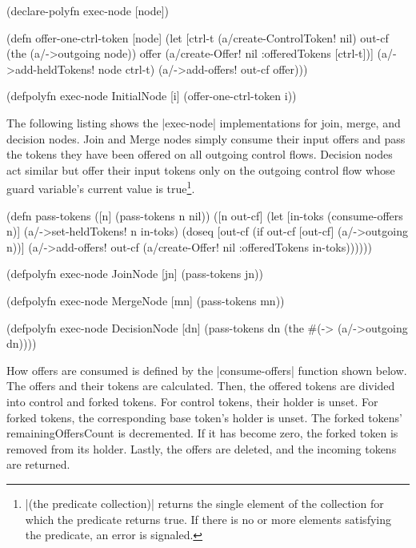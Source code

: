 \documentclass[submission]{eptcs}
\newcommand{\code}{\clojureinline}
\begin{document}
\begin{clojurecode}
(declare-polyfn exec-node [node])

(defn offer-one-ctrl-token [node]
  (let [ctrl-t (a/create-ControlToken! nil)
        out-cf (the (a/->outgoing node))
        offer  (a/create-Offer! nil {:offeredTokens [ctrl-t]})]
    (a/->add-heldTokens! node ctrl-t)
    (a/->add-offers! out-cf offer)))

(defpolyfn exec-node InitialNode [i]
  (offer-one-ctrl-token i))
\end{clojurecode}

The following listing shows the \code|exec-node| implementations for join,
merge, and decision nodes.  Join and Merge nodes simply consume their input
offers and pass the tokens they have been offered on all outgoing control
flows.  Decision nodes act similar but offer their input tokens only on the
outgoing control flow whose guard variable's current value is
true\footnote{\code|(the predicate collection)| returns the single element of
  the collection for which the predicate returns true.  If there is no or more
  elements satisfying the predicate, an error is signaled.}.

\begin{clojurecode}
(defn pass-tokens
  ([n] (pass-tokens n nil))
  ([n out-cf]
   (let [in-toks (consume-offers n)]
     (a/->set-heldTokens! n in-toks)
     (doseq [out-cf (if out-cf [out-cf] (a/->outgoing n))]
       (a/->add-offers!
        out-cf (a/create-Offer!
                nil {:offeredTokens in-toks}))))))

(defpolyfn exec-node JoinNode [jn]
  (pass-tokens jn))

(defpolyfn exec-node MergeNode [mn]
  (pass-tokens mn))

(defpolyfn exec-node DecisionNode [dn]
  (pass-tokens dn (the #(-> %
                       (a/->outgoing dn))))
\end{clojurecode}

How offers are consumed is defined by the \code|consume-offers| function shown
below.  The offers and their tokens are calculated.  Then, the offered tokens
are divided into control and forked tokens.  For control tokens, their holder
is unset.  For forked tokens, the corresponding base token's holder is unset.
The forked tokens' \textsf{remainingOffersCount} is decremented.  If it has
become zero, the forked token is removed from its holder.  Lastly, the offers
are deleted, and the incoming tokens are returned.
\end{document}
